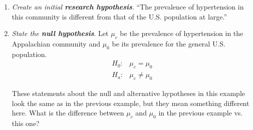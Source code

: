 \begin{enumerate}
\item \textit{Create an initial \textbf{research hypothesis}}. ``The prevalence of hypertension in this community is different from that of the U.S. population at large.''
\item \textit{State the \textbf{null hypothesis}}. Let $\mu_c$ be the prevalence of hypertension in the Appalachian community and $\mu_0$ be its prevalence for the general U.S. population.
\begin{align*}
H_0: & \mu_c = \mu_0 \\
H_a: & \mu_c \neq \mu_0
\end{align*}

\begin{question}{}
These statements about the null and alternative hypotheses in this example look the same as in the previous example, but they mean something different here. What is the difference between $\mu_c$ and $\mu_0$ in the previous example vs. this one?
\end{question}


\end{enumerate}
